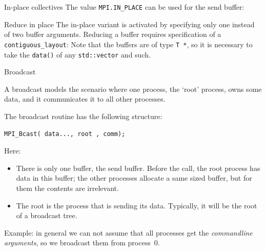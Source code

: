 \begin{pythonnote}{In-place collectives}
  The value \lstinline+MPI.IN_PLACE+ can be used for the send buffer:
\end{pythonnote}

\begin{mplnote}{Reduce in place}
  The in-place variant is activated by
  specifying only one instead of two buffer arguments.
  Reducing a buffer requires specification of a \lstinline+contiguous_layout+:
  Note that the buffers are of type \lstinline+T *+, so it is necessary
  to take the \lstinline+data()+ of any \lstinline+std::vector+ and such.
\end{mplnote}

 {Broadcast}
\label{sec:bcast}

A broadcast models the scenario where one process,
the `root' process,
owns some data, and it communicates it to all other processes.

The broadcast routine
has the following structure:
\begin{lstlisting}
MPI_Bcast( data..., root , comm);
\end{lstlisting}
Here:
\begin{itemize}
\item There is only one buffer, the send buffer.
  Before the call, the root process has data in this buffer;
  the other processes allocate a same sized buffer, but
  for them the contents are irrelevant.
\item 
  The root is the process that is sending its data.
  Typically, it will be the root of a broadcast tree.
\end{itemize}

Example: in general we can not assume that all processes get the
\emph{commandline arguments},
so we broadcast them from process~0.

